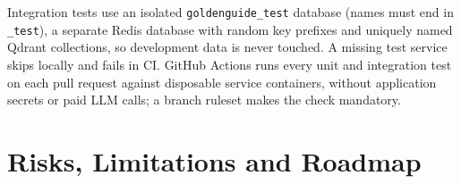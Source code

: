 \documentclass[11pt,letterpaper]{report}
\begin{document}
Integration tests use an isolated \texttt{goldenguide\_test} database (names must end in
\texttt{\_test}), a separate Redis database with random key prefixes and uniquely named Qdrant
collections, so development data is never touched. A missing test service skips locally and fails
in CI. GitHub Actions runs every unit and integration test on each pull request against disposable
service containers, without application secrets or paid LLM calls; a branch ruleset makes the check
mandatory.

\chapter{Risks, Limitations and Roadmap}\label{ch:risks}
\end{document}
